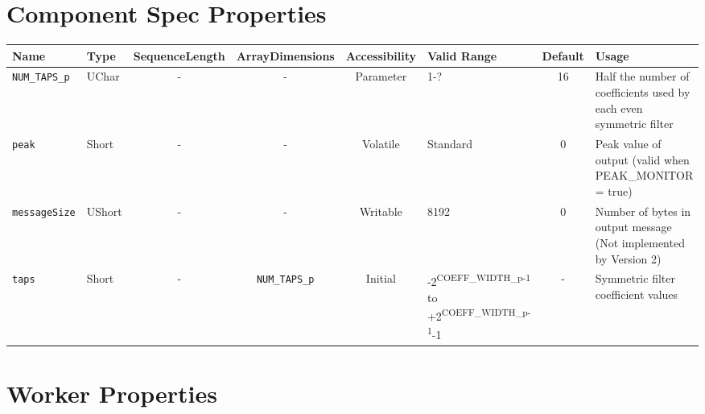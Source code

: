 \documentclass{article}
\begin{document}
\begin{landscape}
	\section*{Component Spec Properties}
	\begin{scriptsize}
		\begin{tabular}{|p{1.5cm}|p{1cm}|c|c|c|p{3cm}|c|p{7cm}|}
			\hline
			\rowcolor{blue}
			Name               & Type   & SequenceLength & ArrayDimensions   & Accessibility       & Valid Range                                                                      & Default & Usage                                                                        \\
			\hline
			\verb+NUM_TAPS_p+  & UChar  & -              & -                 & Parameter & 1-?                                                                              & 16      & Half the number of coefficients used by each           even symmetric filter \\
			\hline
			\verb+peak+        & Short  & -              & -                 & Volatile            & Standard                                                                         & 0       & Peak value of output (valid when PEAK\_MONITOR = true) \\
			\hline
			\verb+messageSize+ & UShort & -              & -                 & Writable & 8192                                                                             & 0       & Number of bytes in output message (Not implemented by Version 2)
			 \\
			\hline
			\verb+taps+        & Short  & -              & \verb+NUM_TAPS_p+ & Initial & -2\textsuperscript{COEFF\_WIDTH\_p-1} to +2\textsuperscript{COEFF\_WIDTH\_p-1}-1 & -       & Symmetric filter coefficient values                                          \\
			\hline
		\end{tabular}
	\end{scriptsize}

	\section*{Worker Properties}

\end{landscape}
\end{document}
